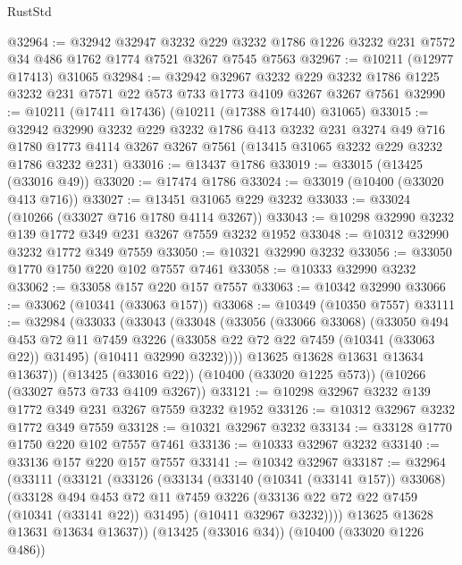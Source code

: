 \begin{lexlean}{RustStd}
\begin{coremodule}
{\begin{coremodule}
{{{{{{{{{{{{{{{{{{{{{{{{{@32964 := @32942
    @32947
    @3232
    @229
    @3232
    @1786
    @1226
    @3232
    @231
    @7572
    @34
    @486
    @1762
    @1774
    @7521
    @3267
    @7545
    @7563
@32967 := @10211 (@12977 @17413) @31065
@32984 := @32942
    @32967
    @3232
    @229
    @3232
    @1786
    @1225
    @3232
    @231
    @7571
    @22
    @573
    @733
    @1773
    @4109
    @3267
    @3267
    @7561
@32990 := @10211 (@17411 @17436) (@10211 (@17388 @17440) @31065)
@33015 := @32942
    @32990
    @3232
    @229
    @3232
    @1786
    @413
    @3232
    @231
    @3274
    @49
    @716
    @1780
    @1773
    @4114
    @3267
    @3267
    @7561
    (@13415 @31065 @3232 @229 @3232 @1786 @3232 @231)
@33016 := @13437 @1786
@33019 := @33015 (@13425 (@33016 @49))
@33020 := @17474 @1786
@33024 := @33019 (@10400 (@33020 @413 @716))
@33027 := @13451 @31065 @229 @3232
@33033 := @33024 (@10266 (@33027 @716 @1780 @4114 @3267))
@33043 := @10298 @32990 @3232 @139 @1772 @349 @231 @3267 @7559 @3232 @1952
@33048 := @10312 @32990 @3232 @1772 @349 @7559
@33050 := @10321 @32990 @3232
@33056 := @33050 @1770 @1750 @220 @102 @7557 @7461
@33058 := @10333 @32990 @3232
@33062 := @33058 @157 @220 @157 @7557
@33063 := @10342 @32990
@33066 := @33062 (@10341 (@33063 @157))
@33068 := @10349 (@10350 @7557)
@33111 := @32984
    (@33033
      (@33043
        (@33048
          (@33056
            (@33066 @33068)
            (@33050
              @494
              @453
              @72
              @11
              @7459
              @3226
              (@33058 @22 @72 @22 @7459 (@10341 (@33063 @22)) @31495)
              (@10411 @32990 @3232))))
        @13625
        @13628
        @13631
        @13634
        @13637))
    (@13425 (@33016 @22))
    (@10400 (@33020 @1225 @573))
    (@10266 (@33027 @573 @733 @4109 @3267))
@33121 := @10298 @32967 @3232 @139 @1772 @349 @231 @3267 @7559 @3232 @1952
@33126 := @10312 @32967 @3232 @1772 @349 @7559
@33128 := @10321 @32967 @3232
@33134 := @33128 @1770 @1750 @220 @102 @7557 @7461
@33136 := @10333 @32967 @3232
@33140 := @33136 @157 @220 @157 @7557
@33141 := @10342 @32967
@33187 := @32964
    (@33111
      (@33121
        (@33126
          (@33134
            (@33140 (@10341 (@33141 @157)) @33068)
            (@33128
              @494
              @453
              @72
              @11
              @7459
              @3226
              (@33136 @22 @72 @22 @7459 (@10341 (@33141 @22)) @31495)
              (@10411 @32967 @3232))))
        @13625
        @13628
        @13631
        @13634
        @13637))
    (@13425 (@33016 @34))
    (@10400 (@33020 @1226 @486))
}}}}}}}}}}}}}}}}}}}}}}}}}
\end{coremodule}}
\end{coremodule}
\end{lexlean}
